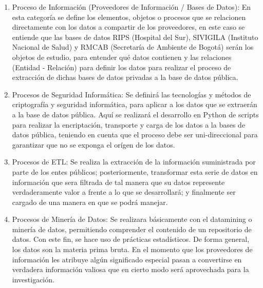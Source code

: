 \documentclass[a4paper, 12pt, oneside]{article}
\theoremstyle{definition}
\theoremstyle{remark}
\begin{document}
\begin{enumerate}[I]
\begin{enumerate}[1.]
\item{Proceso de Información (Proveedores de Información / Bases de Datos): En esta categoría se define los elementos, objetos o procesos que se relacionen directamente con los datos a compartir de los proveedores, en este caso se entiende que las bases de datos RIPS (Hospital del Sur), SIVIGILA (Instituto Nacional de Salud) y RMCAB (Secretaría de Ambiente de Bogotá) serán los objetos de estudio, para entender qué datos contienen y las relaciones (Entidad - Relación) para definir los datos para realizar el proceso de extracción de dichas bases de datos privadas a la base de datos pública.}
\item{Procesos de Seguridad Informática: Se definirá las tecnologías y métodos de criptografía y seguridad informática, para aplicar a los datos que se extraerán a la base de datos pública. Aquí se realizará el desarrollo en Python de scripts para realizar la encriptación, transporte y carga de los datos a la bases de datos pública, teniendo en cuenta que el proceso debe ser uni-direccional para garantizar que no se exponga el orígen de los datos.}
\item{Procesos de ETL: Se realiza la extracción de la información suministrada por parte de los entes públicos; posteriormente, transformar esta serie de datos en información que sera filtrada de tal manera que su datos represente verdaderamente valor a  frente a lo que se desarrollará; y finalmente ser cargado de una manera en que se podrá manejar. }
\item{Procesos de Minería de Datos: Se realizara básicamente con el datamining o minería de datos, permitiendo comprender el contenido de un repositorio de datos. Con este fin, se hace uso de prácticas estadísticos. De forma general, los datos son la materia prima bruta. En el momento que los proveedores de información les atribuye algún significado especial pasan a convertirse en verdadera información valiosa que en cierto modo será aprovechada para la investigación.}

\end{enumerate}
\end{enumerate}

\clearpage
\end{document}
